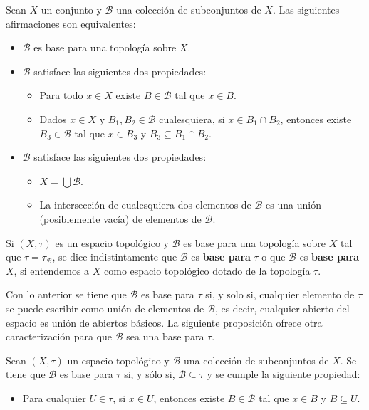 \begin{Prop}
   Sean $X$ un conjunto y $\mathcal{B}$ una colección de subconjuntos de $X$. Las siguientes afirmaciones son equivalentes:
   \begin{itemize}
      \item[1.] $\mathcal{B}$ es base para una topología sobre $X$.
      \item[2.] $\mathcal{B}$ satisface las siguientes dos propiedades:
         \begin{itemize}
            \item Para todo $x\in X$ existe $B\in \mathcal{B}$ tal que $x\in B$.
            \item Dados $x\in X$ y $B_1,B_2\in \mathcal{B}$ cualesquiera, si $x\in B_1\cap B_2$, entonces existe $B_3\in \mathcal{B}$ tal que $x\in B_3$ y $B_3\subseteq B_1\cap B_2$.
         \end{itemize}
      \item[3.] $\mathcal{B}$ satisface las siguientes dos propiedades:
         \begin{itemize}
            \item $X = \bigcup \mathcal{B}$.
            \item La intersección de cualesquiera dos elementos de $\mathcal{B}$ es una unión (posiblemente vacía) de elementos de $\mathcal{B}$.
         \end{itemize}
   \end{itemize}
\end{Prop}
\begin{Obs}
   Si $(X,\tau)$ es un espacio topológico y $\mathcal{B}$ es base para una topología sobre $X$ tal que $\tau = \tau_\mathcal{B}$, se dice indistintamente que $\mathcal{B}$ es \textbf{base para} $\tau$ o que $\mathcal{B}$ es \textbf{base para} $X$, si entendemos a $X$ como espacio topológico dotado de la topología $\tau$.
\end{Obs}
Con lo anterior se tiene que $\mathcal{B}$ es base para $\tau$ si, y solo si, cualquier elemento de $\tau$ se puede escribir como unión de elementos de $\mathcal{B}$, es decir, cualquier abierto del espacio es unión de abiertos básicos. La siguiente proposición ofrece otra caracterización para que $\mathcal{B}$ sea una base para $\tau$.
\begin{Prop}\label{Prop:base_para_tau}
   Sean $(X,\tau)$ un espacio topológico y $\mathcal{B}$ una colección de subconjuntos de $X$. Se tiene que $\mathcal{B}$ es base para $\tau$ si, y sólo si, $\mathcal{B}\subseteq\tau$ y se cumple la siguiente propiedad:
   \begin{itemize}
      \item Para cualquier $U\in \tau$, si $x\in U$, entonces existe $B\in \mathcal{B}$ tal que $x\in B$ y $B\subseteq U$.
   \end{itemize}
\end{Prop}
